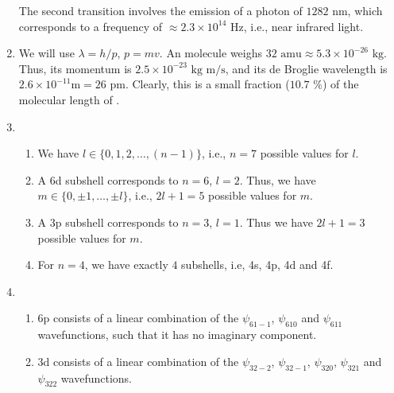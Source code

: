 \documentclass[10pt]{article}
\begin{document}
\begin{enumerate}
                The second transition involves the emission of a photon of $1282 \text{ nm}$, which corresponds to
                a frequency of $\approx 2.3 \times 10^{14} \text{ Hz}$, i.e., near infrared light.
                
                \item We will use $\lambda = h/p$, $p = mv$.
                An  molecule weighs $32 \text{ amu} \approx 5.3 \times 10^{-26} \text{ kg}$. Thus, its momentum is $2.5 \times 10^{-23}
                \text{ kg m/s}$, and its de Broglie wavelength is $2.6 \times 10^{-11} \text{m} = 26 \text{ pm}$. Clearly, this is
                a small fraction ($10.7 \text{ \%}$) of the molecular length of .

                \item 
                \begin{enumerate}
                        \item We have $l \in \{0, 1, 2, \dots, (n-1)\}$, i.e., $n = 7$ possible values for $l$.
                        \item A 6d subshell corresponds to $n = 6$, $l = 2$. Thus, we have $m \in \{0, \pm 1, \dots, \pm l\}$,
                        i.e., $2l + 1 = 5$ possible values for $m$.
                        \item A 3p subshell corresponds to $n = 3$, $l = 1$. Thus we have $2l + 1 = 3$ possible values for $m$.
                        \item For $n = 4$, we have exactly $4$ subshells, i.e, 4s, 4p, 4d and 4f.
                \end{enumerate}

                \item
                \begin{enumerate}
                        \item 6p consists of a linear combination of the $\psi_{61-1}$, $\psi_{610}$ and $\psi_{611}$ wavefunctions, such
                        that it has no imaginary component.
                        \item 3d consists of a linear combination of the $\psi_{32-2}$, $\psi_{32-1}$, $\psi_{320}$, $\psi_{321}$ and $\psi_{322}$
                        wavefunctions.
                \end{enumerate}
        \end{enumerate}
\end{document}
